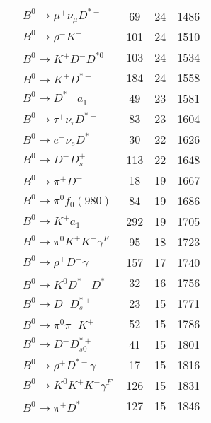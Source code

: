 \documentclass[landscape]{article}
\newcounter{rownumbers}
\newcommand\rn{\stepcounter{rownumbers}\arabic{rownumbers}}
\newcommand{\EOL}{\\} %
\newcommand{\topoTags}[1]{#1} %
\begin{document}
\begin{longtable}{clccc}
\rn & $ B^{0} \rightarrow \mu^{+} \nu_{\mu} D^{*-} $ & \topoTags{69 & }24 & 1486 \EOL

\rn & $ B^{0} \rightarrow \rho^{-} K^{+} $ & \topoTags{101 & }24 & 1510 \EOL

\rn & $ B^{0} \rightarrow K^{+} D^{-} D^{*0} $ & \topoTags{103 & }24 & 1534 \EOL

\rn & $ B^{0} \rightarrow K^{+} D^{*-} $ & \topoTags{184 & }24 & 1558 \EOL

\rn & $ B^{0} \rightarrow D^{*-} a_{1}^{+} $ & \topoTags{49 & }23 & 1581 \EOL

\rn & $ B^{0} \rightarrow \tau^{+} \nu_{\tau} D^{*-} $ & \topoTags{83 & }23 & 1604 \EOL

\rn & $ B^{0} \rightarrow e^{+} \nu_{e} D^{*-} $ & \topoTags{30 & }22 & 1626 \EOL

\rn & $ B^{0} \rightarrow D^{-} D_{s}^{+} $ & \topoTags{113 & }22 & 1648 \EOL

\rn & $ B^{0} \rightarrow \pi^{+} D^{-} $ & \topoTags{18 & }19 & 1667 \EOL

\rn & $ B^{0} \rightarrow \pi^{0} f_{0}(980) $ & \topoTags{84 & }19 & 1686 \EOL

\rn & $ B^{0} \rightarrow K^{+} a_{1}^{-} $ & \topoTags{292 & }19 & 1705 \EOL

\rn & $ B^{0} \rightarrow \pi^{0} K^{+} K^{-} \gamma^{F} $ & \topoTags{95 & }18 & 1723 \EOL

\rn & $ B^{0} \rightarrow \rho^{+} D^{-} \gamma $ & \topoTags{157 & }17 & 1740 \EOL

\rn & $ B^{0} \rightarrow K^{0} D^{*+} D^{*-} $ & \topoTags{32 & }16 & 1756 \EOL

\rn & $ B^{0} \rightarrow D^{-} D_{s}^{*+} $ & \topoTags{23 & }15 & 1771 \EOL

\rn & $ B^{0} \rightarrow \pi^{0} \pi^{-} K^{+} $ & \topoTags{52 & }15 & 1786 \EOL

\rn & $ B^{0} \rightarrow D^{-} D_{s0}^{*+} $ & \topoTags{41 & }15 & 1801 \EOL

\rn & $ B^{0} \rightarrow \rho^{+} D^{*-} \gamma $ & \topoTags{17 & }15 & 1816 \EOL

\rn & $ B^{0} \rightarrow K^{0} K^{+} K^{-} \gamma^{F} $ & \topoTags{126 & }15 & 1831 \EOL

\rn & $ B^{0} \rightarrow \pi^{+} D^{*-} $ & \topoTags{127 & }15 & 1846 \EOL


\end{longtable}
\end{document}

